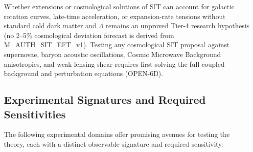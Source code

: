 \documentclass[american,11pt,letterpaper]{article}
\def\texttt#1{#1}%
\begin{document}
Whether extensions or cosmological solutions of SIT can account for galactic rotation curves, late-time acceleration, or expansion-rate tensions without standard cold dark matter and $\Lambda$ remains an unproved Tier-4 research hypothesis (no 2--5\% cosmological deviation forecast is derived from \texttt{M\_AUTH\_SIT\_EFT\_v1}). Testing any cosmological SIT proposal against supernovae, baryon acoustic oscillations, Cosmic Microwave Background anisotropies, and weak-lensing shear requires first solving the full coupled background and perturbation equations (\texttt{OPEN-6D}).

\subsection*{Experimental Signatures and Required Sensitivities}

The following experimental domains offer promising avenues for testing the theory, each with a distinct observable signature and required sensitivity:
\end{document}
